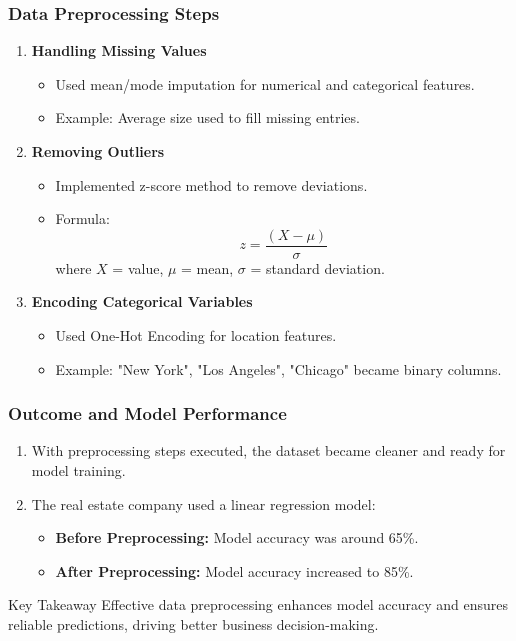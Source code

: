 \documentclass[aspectratio=169]{beamer}
\begin{document}
\begin{frame}[fragile]
    \frametitle{Data Preprocessing Steps}
    \begin{enumerate}
        \item \textbf{Handling Missing Values}
            \begin{itemize}
                \item Used mean/mode imputation for numerical and categorical features.
                \item Example: Average size used to fill missing entries.
            \end{itemize}
        
        \item \textbf{Removing Outliers}
            \begin{itemize}
                \item Implemented z-score method to remove deviations.
                \item Formula: 
                \[
                z = \frac{(X - \mu)}{\sigma}
                \]
                where \(X\) = value, \(\mu\) = mean, \(\sigma\) = standard deviation.
            \end{itemize}
        
        \item \textbf{Encoding Categorical Variables}
            \begin{itemize}
                \item Used One-Hot Encoding for location features.
                \item Example: "New York", "Los Angeles", "Chicago" became binary columns.
            \end{itemize}
    \end{enumerate}
\end{frame}

\begin{frame}[fragile]
    \frametitle{Outcome and Model Performance}
    \begin{enumerate}
        \item With preprocessing steps executed, the dataset became cleaner and ready for model training.
        \item The real estate company used a linear regression model:
        \begin{itemize}
            \item \textbf{Before Preprocessing:} Model accuracy was around 65\%.
            \item \textbf{After Preprocessing:} Model accuracy increased to 85\%.
        \end{itemize}
    \end{enumerate}
    \begin{block}{Key Takeaway}
        Effective data preprocessing enhances model accuracy and ensures reliable predictions, driving better business decision-making.
    \end{block}
\end{frame}
\end{document}
